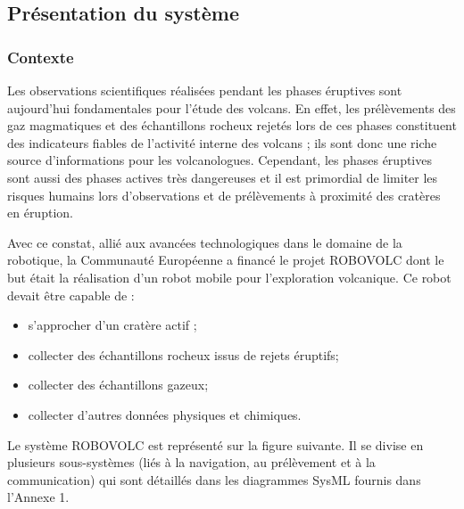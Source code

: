 \documentclass[10pt,fleqn]{article} %
\begin{document}
\def\pathfig{images}

\vspace{4.5cm}
\pagestyle{fancy}
\thispagestyle{plain}

\def\columnseprulecolor{\color{ocre}}
\setlength{\columnseprule}{0.4pt} 

\def\pathfig{images}

\ifprof
\else
\begin{multicols}{2}
\fi


\subsection*{Présentation du système}

\setcounter{subparagraph}{0}

\subsubsection*{Contexte}

Les observations scientifiques réalisées pendant les phases éruptives sont aujourd'hui fondamentales pour l'étude des volcans. En effet, les prélèvements des gaz magmatiques et des échantillons rocheux rejetés lors de ces phases constituent des indicateurs fiables de l'activité interne des volcans ; ils sont donc une riche source d'informations pour les volcanologues. Cependant, les phases éruptives sont aussi des phases actives très dangereuses et il est primordial de limiter les risques humains lors d'observations et de prélèvements à proximité des cratères en éruption.

Avec ce constat, allié aux avancées technologiques dans le domaine de la robotique, la Communauté Européenne a financé le projet ROBOVOLC dont le but était la réalisation d'un robot mobile pour l'exploration volcanique. Ce robot devait être capable de :
\begin{itemize}
\item s'approcher d'un cratère actif ;
\item collecter des échantillons rocheux issus de rejets éruptifs;
\item collecter des échantillons gazeux;
\item collecter d'autres données physiques et chimiques.
\end{itemize}

Le système ROBOVOLC est représenté sur la figure suivante. Il se divise en plusieurs sous-systèmes (liés à la navigation, au prélèvement et à la communication) qui sont détaillés dans les diagrammes SysML fournis dans l'Annexe 1.


\end{multicols}
\end{document}
